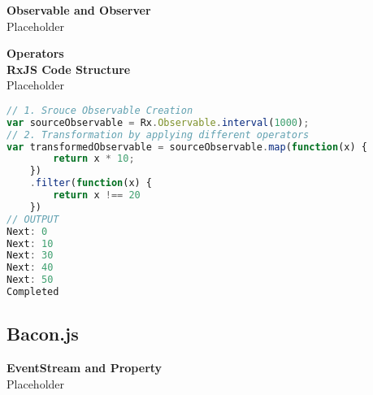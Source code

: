 






\textbf{Observable and Observer}\\
Placeholder

\textbf{Operators}
\label{subsec:Operators}\\

\textbf{RxJS Code Structure}\\
Placeholder
\begin{lstlisting}[language=JavaScript, caption=RxJS Simple Example, label={lst:RxJS_Simple_Example}]
// 1. Srouce Observable Creation
var sourceObservable = Rx.Observable.interval(1000);
// 2. Transformation by applying different operators
var transformedObservable = sourceObservable.map(function(x) {
		return x * 10;
	})
	.filter(function(x) {
		return x !== 20
	})
// OUTPUT
Next: 0
Next: 10
Next: 30
Next: 40
Next: 50
Completed
\end{lstlisting}

\subsection{Bacon.js}

\textbf{EventStream and Property}\\
Placeholder

